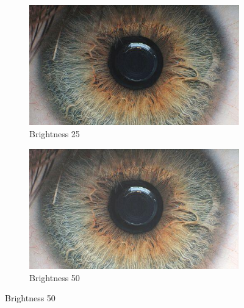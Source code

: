\documentclass{article}
\begin{document}
\begin{figure}[H]
\begin{subfigure}[b]{0.5\linewidth}
\centering
  \includegraphics[width=0.9\linewidth]{res/bright25.jpg}
  \caption{Brightness 25}
   \label{fig:bright_25}
\end{subfigure}%
\begin{subfigure}[b]{0.5\linewidth}
\centering
  \includegraphics[width=0.9\linewidth]{res/bright50.jpg}
  \caption{Brightness 50}
   \label{fig:bright_50}
\end{subfigure}%


\end{figure}
\end{document}
